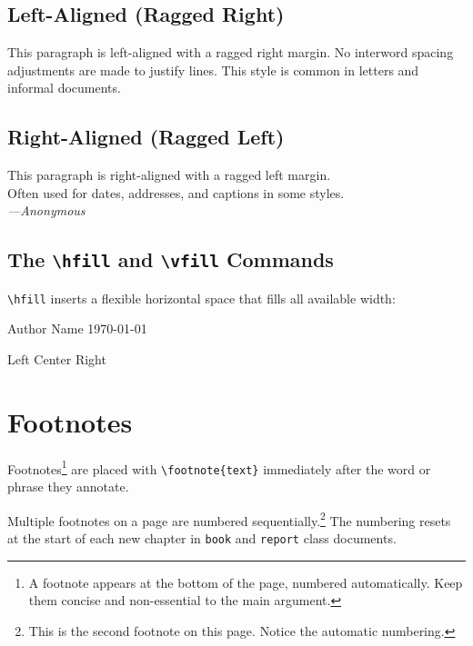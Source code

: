 \documentclass[12pt,a4paper]{article}
\begin{document}
\subsection{Left-Aligned (Ragged Right)}

\begin{flushleft}
    This paragraph is left-aligned with a ragged right margin.
    No interword spacing adjustments are made to justify lines.
    This style is common in letters and informal documents.
\end{flushleft}

\subsection{Right-Aligned (Ragged Left)}

\begin{flushright}
    This paragraph is right-aligned with a ragged left margin.\\
    Often used for dates, addresses, and captions in some styles.\\
    \textit{—Anonymous}
\end{flushright}

\subsection{The \texttt{\textbackslash hfill} and \texttt{\textbackslash vfill} Commands}

\texttt{\textbackslash hfill} inserts a flexible horizontal space that
fills all available width:

\noindent Author Name \hfill \today

\medskip
\noindent Left \hfill Center \hfill Right


\section{Footnotes}
\label{sec:footnotes}

Footnotes\footnote{A footnote appears at the bottom of the page, numbered
automatically. Keep them concise and non-essential to the main argument.}
are placed with \verb|\footnote{text}| immediately after the word or phrase
they annotate.

Multiple footnotes on a page are numbered sequentially.\footnote{This is the
second footnote on this page. Notice the automatic numbering.} The numbering
resets at the start of each new chapter in \texttt{book} and \texttt{report}
class documents.
\end{document}
